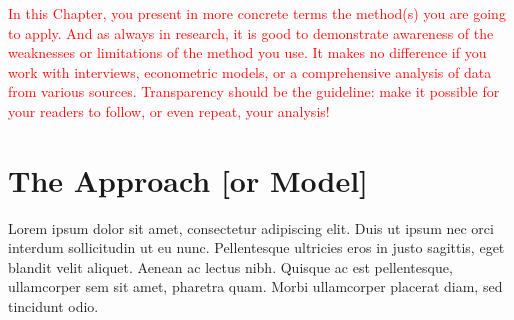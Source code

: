\textcolor{red}{In this Chapter, you present in more concrete terms the method(s) you are going to apply. And as always in research, it is good to demonstrate awareness of the weaknesses or limitations of the method you use. It makes no difference if you work with interviews, econometric models, or a comprehensive analysis of data from various sources. Transparency should be the guideline: make it possible for your readers to follow, or even repeat, your analysis!}

\section{The Approach [or Model]}
Lorem ipsum dolor sit amet, consectetur adipiscing elit. Duis ut ipsum nec orci interdum sollicitudin ut eu nunc. Pellentesque ultricies eros in justo sagittis, eget blandit velit aliquet. Aenean ac lectus nibh. Quisque ac est pellentesque, ullamcorper sem sit amet, pharetra quam. Morbi ullamcorper placerat diam, sed tincidunt odio.